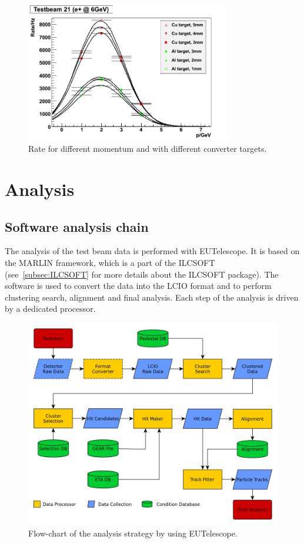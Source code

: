     \begin{figure}[!h]
      \centering
      \includegraphics[width = 0.8\textwidth]{Pictures/X0/rate_vs_p_t21.png}
      \caption{Rate for different momentum and with different converter targets\cite{DESYII}.}
      \label{fig:rateTB21}
    \end{figure}


  \section{Analysis}
  \label{sec:X0}

   \subsection{Software analysis chain}

    The analysis of the test beam data is performed with EUTelescope\cite{Eutel}\cite{Jansen}.
    It is based on the MARLIN framework, which is a part of the ILCSOFT (see~\ref{subsec:ILCSOFT} for more details about the ILCSOFT package).
    The software is used to convert the data into the LCIO format and to perform clustering search, alignment and final analysis.
    Each step of the analysis is driven by a dedicated processor.
    
    \begin{figure}[!h]
      \centering
      \includegraphics[width = \textwidth]{Pictures/X0/eutel-strategy.png}
      \caption{Flow-chart of the analysis strategy by using EUTelescope.}
      \label{fig:eutel-strategy}
    \end{figure}

